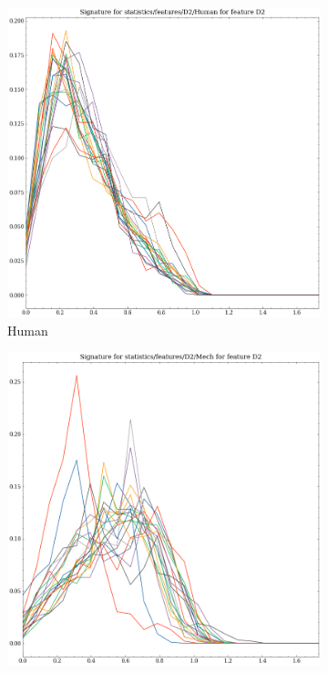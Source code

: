 \begin{figure}[t!p]
    \begin{subfigure}[b]{0.23\textwidth}
        \includegraphics[width=\textwidth]{assets/feature_extraction/D2/Human.png}
        \caption{Human}
    \end{subfigure}
    \hfill
    \begin{subfigure}[b]{0.23\textwidth}
        \includegraphics[width=\textwidth]{assets/feature_extraction/D2/Mech.png}

\end{subfigure}
\end{figure}

